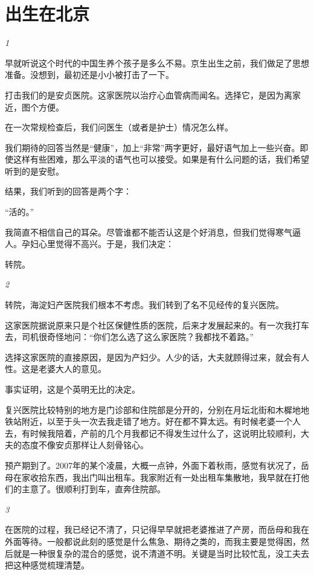 \documentclass[twoside,openright,headings=optiontohead]{ctexbook} %
\begin{document}
{\chapter*{出生在北京}\label{born-in-beijing}

\emph{1}

早就听说这个时代的中国生养个孩子是多么不易。京生出生之前，我们做足了思想准备。没想到，最初还是小小被打击了一下。

打击我们的是安贞医院。这家医院以治疗心血管病而闻名。选择它，是因为离家近，图个方便。

在一次常规检查后，我们问医生（或者是护士）情况怎么样。

我们期待的回答当然是``健康''，加上``非常''两字更好，最好语气加上一些兴奋。即使这样有些困难，那么平淡的语气也可以接受。如果是有什么问题的话，我们希望听到的是安慰。

结果，我们听到的回答是两个字：

``活的。''

我简直不相信自己的耳朵。尽管谁都不能否认这是个好消息，但我们觉得寒气逼人。孕妇心里觉得不高兴。于是，我们决定：

转院。

\emph{2}

转院，海淀妇产医院我们根本不考虑。我们转到了名不见经传的复兴医院。

这家医院据说原来只是个社区保健性质的医院，后来才发展起来的。有一次我打车去，司机很奇怪地问：``你们怎么选了这么家医院？我都找不着路。''

选择这家医院的直接原因，是因为产妇少。人少的话，大夫就顾得过来，就会有人性。这是老婆大人的意见。

事实证明，这是个英明无比的决定。

复兴医院比较特别的地方是门诊部和住院部是分开的，分别在月坛北街和木樨地地铁站附近，以至于头一次去我走错了地方。好在都不算太远。有时候老婆一个人去，有时候我陪着，产前的几个月我都记不得发生过什么了，这说明比较顺利，大夫的态度不像安贞那样让人刻骨铭心。

预产期到了。2007年的某个凌晨，大概一点钟，外面下着秋雨，感觉有状况了，岳母在家收拾东西，我出门叫出租车。我家附近有一处出租车集散地，我早就在打他们的主意了。很顺利打到车，直奔住院部。

\emph{3}

在医院的过程，我已经记不清了，只记得早早就把老婆推进了产房，而岳母和我在外面等待。一般都说此刻的感觉是什么焦急、期待之类的，而我主要是觉得困，然后就是一种很复杂的混合的感觉，说不清道不明。关键是当时比较忙乱，没工夫去把这种感觉梳理清楚。

}
\end{document}
